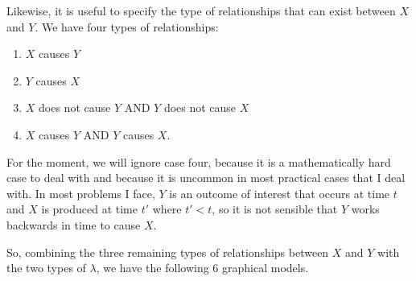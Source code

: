 \documentclass{article}
\begin{document}
Likewise, it is useful to specify the type of relationships that can exist between $X$ and $Y$. We have four types of relationships:
\begin{enumerate}
    \item $X$ causes $Y$
    \item $Y$ causes $X$
    \item $X$ does not cause $Y$ AND $Y$ does not cause $X$
    \item $X$ causes $Y$ AND $Y$ causes $X$.
\end{enumerate}

For the moment, we will ignore case four, because it is a mathematically hard case to deal with and because it is uncommon in most practical cases that I deal with. In most problems I face, $Y$ is an outcome of interest that occurs at time $t$ and $X$ is produced at time $t'$ where $t' < t$, so it is not sensible that $Y$ works backwards in time to cause $X$.

So, combining the three remaining types of relationships between $X$ and $Y$ with the two types of $\lambda$, we have the following 6 graphical models.
\end{document}
